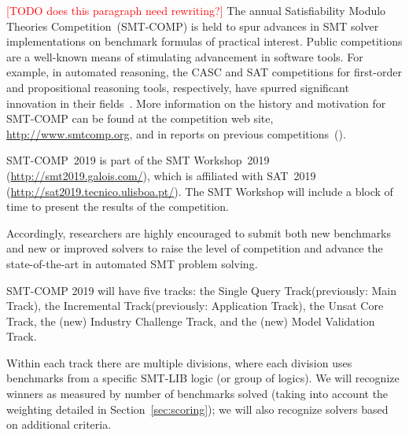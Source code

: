 \documentclass[12pt]{article}
\newcommand{\rem}[1]{\textcolor{red}{[#1]}}
\newcommand{\todo}[1]{\rem{TODO #1}}
\newcommand{\maintrack}{Single Query Track\xspace}
\newcommand{\inctrack}{Incremental Track\xspace}
\newcommand{\ucoretrack}{Unsat Core Track\xspace}
\newcommand{\mvaltrack}{Model Validation Track\xspace}
\newcommand{\challtrack}{Industry Challenge Track\xspace}
\begin{document}
\todo{does this paragraph need rewriting?}
The annual Satisfiability Modulo Theories Competition~(SMT-COMP) is
held to spur advances in SMT solver implementations on benchmark
formulas of practical interest.  Public competitions are a well-known
means of stimulating advancement in software tools.  For example, in
automated reasoning, the CASC and SAT competitions for first-order and
propositional reasoning tools, respectively, have spurred significant
innovation in their fields~\cite{leberre+03,PSS02}.  More information
on the history and motivation for SMT-COMP can be found at the
competition web site, \url{http://www.smtcomp.org}, and in reports on
previous
competitions~(\cite{SMTCOMP-JAR,SMTCOMP-FMSD,BDOS08,SMTCOMP-2008,CDW14,SMTCOMP-2012,CSW15}).

SMT-COMP~2019 is part of the SMT Workshop~2019
(\url{http://smt2019.galois.com/}),
which is affiliated with SAT~2019 (\url{http://sat2019.tecnico.ulisboa.pt/}).
The SMT Workshop will include a block of time to present the results of the
competition.

Accordingly, researchers are highly encouraged to submit both new
benchmarks and new or improved solvers to raise the level of
competition and advance the state-of-the-art in automated SMT problem
solving.

SMT-COMP 2019 will have five tracks: the \maintrack (previously: Main Track),
the \inctrack (previously: Application Track), the \ucoretrack,
the (new) \challtrack, and the (new)
\mvaltrack.

Within each track there are multiple divisions, where each division
uses benchmarks from a specific SMT-LIB logic (or group of logics).
We will recognize winners as measured by number of benchmarks solved
(taking into account the weighting detailed in
Section~\ref{sec:scoring}); we will also recognize solvers based on
additional criteria.
\end{document}
